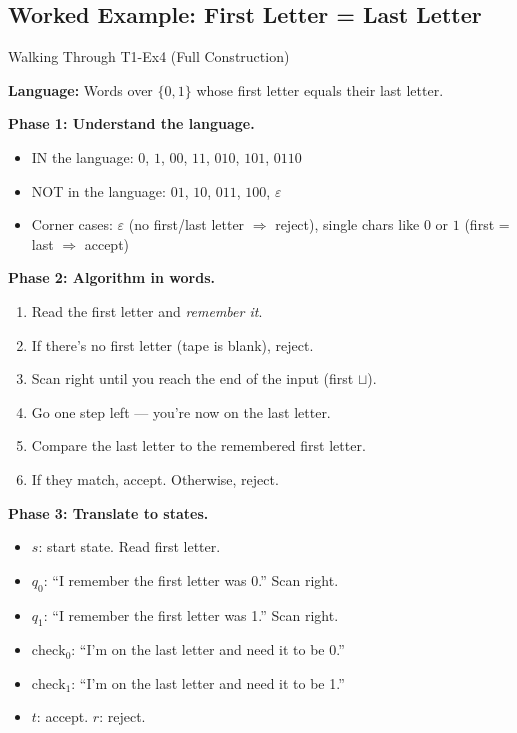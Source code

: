 \documentclass[11pt,a4paper]{article}
\newcommand{\blank}{\sqcup}
\begin{document}
\subsection{Worked Example: First Letter = Last Letter}

\begin{examplebox}{Walking Through T1-Ex4 (Full Construction)}

\textbf{Language:} Words over $\{0,1\}$ whose first letter equals their last letter.

\textbf{Phase 1: Understand the language.}
\begin{itemize}
    \item IN the language: $0$, $1$, $00$, $11$, $010$, $101$, $0110$
    \item NOT in the language: $01$, $10$, $011$, $100$, $\varepsilon$
    \item Corner cases: $\varepsilon$ (no first/last letter $\Rightarrow$ reject), single chars like $0$ or $1$ (first = last $\Rightarrow$ accept)
\end{itemize}

\textbf{Phase 2: Algorithm in words.}
\begin{enumerate}
    \item Read the first letter and \emph{remember it}.
    \item If there's no first letter (tape is blank), reject.
    \item Scan right until you reach the end of the input (first $\blank$).
    \item Go one step left --- you're now on the last letter.
    \item Compare the last letter to the remembered first letter.
    \item If they match, accept. Otherwise, reject.
\end{enumerate}

\textbf{Phase 3: Translate to states.}
\begin{itemize}
    \item $s$: start state. Read first letter.
    \item $q_0$: ``I remember the first letter was 0.'' Scan right.
    \item $q_1$: ``I remember the first letter was 1.'' Scan right.
    \item $\text{check}_0$: ``I'm on the last letter and need it to be 0.''
    \item $\text{check}_1$: ``I'm on the last letter and need it to be 1.''
    \item $t$: accept. $r$: reject.
\end{itemize}


\end{examplebox}
\end{document}
